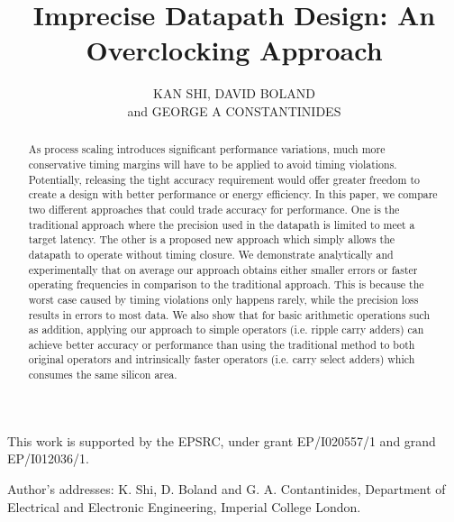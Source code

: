 \documentclass[prodmode,acmtrets]{acmsmall} %
\begin{document}

\title{Imprecise Datapath Design: An Overclocking Approach}
\author{KAN SHI, DAVID BOLAND\\
and GEORGE A CONSTANTINIDES
}


\begin{abstract}
As process scaling introduces significant performance variations, much more conservative timing margins will have to be applied to avoid timing violations. Potentially, releasing the tight accuracy requirement would offer greater freedom to create a design with better performance or energy efficiency. In this paper, we compare two different approaches that could trade accuracy for performance. One is the traditional approach where the precision used in the datapath is limited to meet a target latency. The other is a proposed new approach which simply allows the datapath to operate without timing closure. We demonstrate analytically and experimentally that on average our approach obtains either smaller errors or faster operating frequencies in comparison to the traditional approach. This is because the worst case caused by timing violations only happens rarely, while the precision loss results in errors to most data. We also show that for basic arithmetic operations such as addition, applying our approach to simple operators (i.e. ripple carry adders) can achieve better accuracy or performance than using the traditional method to both original operators and intrinsically faster operators (i.e. carry select adders) which consumes the same silicon area.
\end{abstract}





\begin{bottomstuff}
This work is supported by the EPSRC, under
grant EP/I020557/1 and grand EP/I012036/1.

Author's addresses: K. Shi, D. Boland {and} G. A. Contantinides,
Department of Electrical and Electronic Engineering,
Imperial College London.
\end{bottomstuff}
\end{document}
